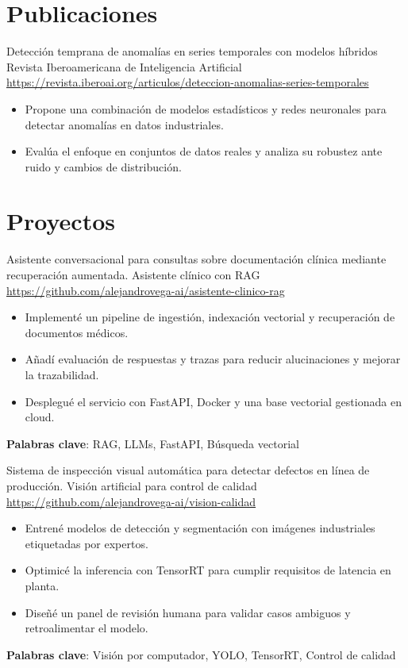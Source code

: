 \documentclass[a4paper, serif, 10pt]{moderncv}
\begin{document}
\section{Publicaciones}

        {Detección temprana de anomalías en series temporales con modelos híbridos}
        {Revista Iberoamericana de Inteligencia Artificial}
        {\url{https://revista.iberoai.org/articulos/deteccion-anomalias-series-temporales}}
        {}
        {\begin{itemize}
\item Propone una combinación de modelos estadísticos y redes neuronales para detectar anomalías en datos industriales.
\item Evalúa el enfoque en conjuntos de datos reales y analiza su robustez ante ruido y cambios de distribución.
\end{itemize}}
\section{Proyectos}

        {Asistente conversacional para consultas sobre documentación clínica mediante recuperación aumentada.}
        {Asistente clínico con RAG}
        {\url{https://github.com/alejandrovega-ai/asistente-clinico-rag}}
        {}
        {\begin{itemize}
\item Implementé un pipeline de ingestión, indexación vectorial y recuperación de documentos médicos.
\item Añadí evaluación de respuestas y trazas para reducir alucinaciones y mejorar la trazabilidad.
\item Desplegué el servicio con FastAPI, Docker y una base vectorial gestionada en cloud.
\end{itemize}
\textbf{Palabras clave}: RAG, LLMs, FastAPI, Búsqueda vectorial}

        {Sistema de inspección visual automática para detectar defectos en línea de producción.}
        {Visión artificial para control de calidad}
        {\url{https://github.com/alejandrovega-ai/vision-calidad}}
        {}
        {\begin{itemize}
\item Entrené modelos de detección y segmentación con imágenes industriales etiquetadas por expertos.
\item Optimicé la inferencia con TensorRT para cumplir requisitos de latencia en planta.
\item Diseñé un panel de revisión humana para validar casos ambiguos y retroalimentar el modelo.
\end{itemize}
\textbf{Palabras clave}: Visión por computador, YOLO, TensorRT, Control de calidad}
\end{document}
